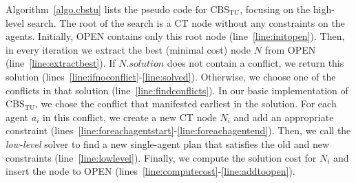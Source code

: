 \documentclass[jair,twoside,11pt,theapa]{article}
\newcommand{\cbstu}{CBS$\mathrm{_{TU}}$\xspace}
\begin{document}
Algorithm~\ref{algo.cbstu} lists the pseudo code for \cbstu, focusing on the high-level search. 
The root of the search is a CT node without any constraints on the agents. 
Initially, OPEN contains only this root node (line~\ref{line:initopen}). 
Then, in every iteration we extract the best (minimal cost) node $N$ from OPEN (line~\ref{line:extractbest}). 
If $N.solution$ does not contain a conflict, we return this solution (lines~\ref{line:ifnoconflict}-\ref{line:solved}). 
Otherwise, we choose one of the conflicts in that solution (line~\ref{line:findconflicts}). 
In our basic implementation of \cbstu, we chose the conflict that manifested earliest in the solution. 
For each agent $a_i$ in this conflict, we create a new CT node $N_i$ and add an appropriate constraint (lines~\ref{line:foreachagentstart}-\ref{line:foreachagentend}). 
Then, we call the \emph{low-level} solver to find a new single-agent plan that satisfies the old and new constraints (line~\ref{line:lowlevel}). 
Finally, we compute the solution cost for $N_i$ and insert the node to OPEN (lines~\ref{line:computecost}-\ref{line:addtoopen}).  %
\end{document}
